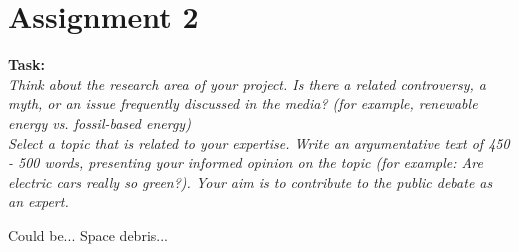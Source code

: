 \section{Assignment 2}

\textbf{Task:} \\
\textit{Think about the research area of your project. Is there a related controversy, a myth, or an issue frequently discussed in the media? (for example, renewable energy vs. fossil-based energy) } \\

\textit{Select a topic that is related to your expertise. Write an argumentative text of 450 - 500 words, presenting your informed opinion on the topic (for example: Are electric cars really so green?). Your aim is to contribute to the public debate as an expert. }


Could be... Space debris... 